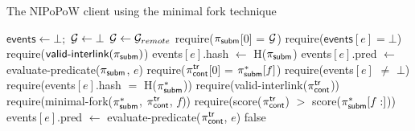 \begin{algorithm}
    \caption{\label{alg:minimal-fork}The \textsf{NIPoPoW} client using the minimal fork technique}

    \begin{algorithmic}[1]

    \State $\textsf{events} \gets \bot;$ $\mathcal{G} \gets \bot$
        \State $\mathcal{G} \gets \mathcal{G}_{remote}$
    \EndFunction
        \State \textsf{require}($\mathsf{\pi_{subm}}$[0] = $\mathcal{G}$)
        \State \textsf{require}($\textsf{events$[e]$} = \bot$)
        \State \textsf{require}($\textsf{valid-interlink}(\mathsf{\pi_{subm}})$)
        \State \textsf{events$[e]$.hash} $\gets$ \textsf{H}($\mathsf{\pi_{subm}}$)
        \State \textsf{events$[e]$.pred} $\gets$
        \textsf{evaluate-predicate}(\textsf{$\mathsf{\pi_{subm}}$}, $e$)
    \EndFunction
        \State \textsf{require}($\mathsf{\pi_{cont}^{tr}}$[0] = $\mathsf{\pi_{subm}^*}[f]$)
        \State \textsf{require}(\textsf{events}$[e]$ $\ne$ $\bot$)
        \State \textsf{require}(\textsf{events$[e]$.hash} $=$ \textsf{H}($\mathsf{\pi_{subm}^*}$))
        \State \textsf{require}(\textsf{valid-interlink}($\mathsf{\pi_{cont}^{tr}}$))
        \State \textsf{require}(\textsf{minimal-fork}($\mathsf{\pi_{subm}^*}$,
        $\mathsf{\pi_{cont}^{tr}}$, $f$))
        \State \textsf{require}(\textsf{score}($\mathsf{\pi_{cont}^{tr}}$)
            $>$ \textsf{score}($\mathsf{\pi_{subm}^*}[f:]$))
        \State \textsf{events$[e]$.pred} $\gets$
            \textsf{evaluate-predicate}($\mathsf{\pi_{cont}^{tr}}$, $e$)
    \EndFunction
                \State\Return false
            \EndIf
        \EndFor
    \EndFunction
    \EndContract
    \vskip8pt
    \end{algorithmic}
\end{algorithm}

